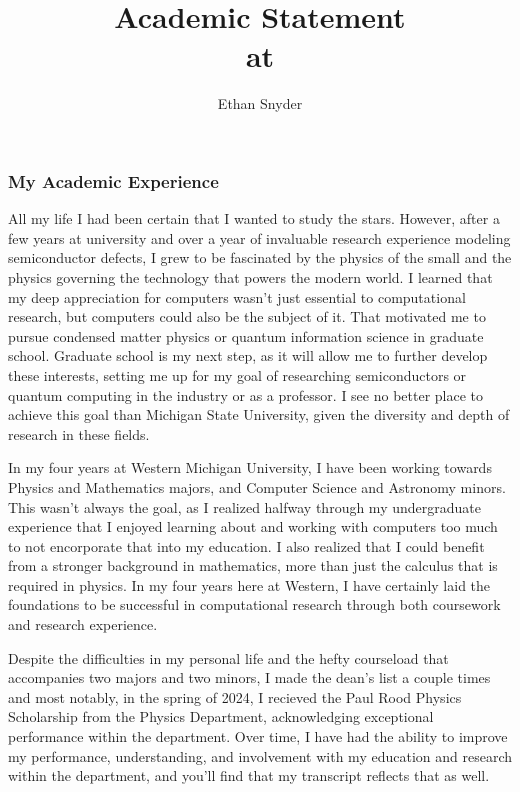 \documentclass[11pt]{article}
\title{Academic Statement\\
	\large \dept{} at \school{}}
\author{Ethan Snyder}
\newcommand{\school}{Michigan State University}
\begin{document}
\maketitle
\subsubsection*{My Academic Experience}
All my life I had been certain that I wanted to study the stars. However, after a few years at university and over a year of invaluable research experience modeling semiconductor defects, I grew to be fascinated by the physics of the small and the physics governing the technology that powers the modern world. I learned that my deep appreciation for computers wasn't just essential to computational research, but computers could also be the subject of it. That motivated me to pursue condensed matter physics or quantum information science in graduate school. Graduate school is my next step, as it will allow me to further develop these interests, setting me up for my goal of researching semiconductors or quantum computing in the industry or as a professor. I see no better place to achieve this goal than \school{}, given the diversity and depth of research in these fields.

In my four years at Western Michigan University, I have been working towards Physics and Mathematics majors, and Computer Science and Astronomy minors. This wasn't always the goal, as I realized halfway through my undergraduate experience that I enjoyed learning about and working with computers too much to not encorporate that into my education. I also realized that I could benefit from a stronger background in mathematics, more than just the calculus that is required in physics. In my four years here at Western, I have certainly laid the foundations to be successful in computational research through both coursework and research experience.

Despite the difficulties in my personal life and the hefty courseload that accompanies two majors and two minors, I made the dean's list a couple times and most notably, in the spring of 2024, I recieved the Paul Rood Physics Scholarship from the Physics Department, acknowledging exceptional performance within the department. Over time, I have had the ability to improve my performance, understanding, and involvement with my education and research within the department, and you'll find that my transcript reflects that as well.
\end{document}

